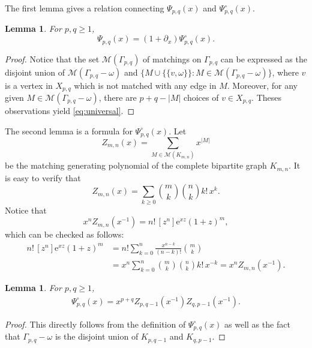 \documentclass[12pt,a4paper,reqno]{amsart}
\numberwithin{equation}{section}
\newtheorem{lemma}[theorem]{Lemma}
\theoremstyle{definition}
\theoremstyle{remark}
\newcommand{\Match}{\mathcal M}
\newcommand{\e}{\mathrm e}
\begin{document}
The first lemma gives  a relation connecting $ \Psi_{p,q}(x)$ and $\Psi^{\circ}_{p,q}(x)$. 

\begin{lemma}\label{lem:universal}
For   $p,q\geq1$,
\begin{equation}\label{eq:universal}
 \Psi_{p,q}(x)=(1+\partial_x)\Psi^{\circ}_{p,q}(x).
\end{equation}
\end{lemma}

\begin{proof}
Notice that the set  $\Match(\Gamma_{p,q})$ of matchings on $\Gamma_{p,q}$ can be expressed as the disjoint union of  $\Match(\Gamma_{p,q}-\omega)$ and $\{M\cup\{\{v,\omega\}\}\colon M\in\Match(\Gamma_{p,q}-\omega)\}$, where $v$ is a vertex in $X_{p,q}$ which is not matched with any edge in $M$. Moreover, for any given $M\in\Match(\Gamma_{p,q}-\omega)$, there are $p+q-|M|$ choices of $v\in X_{p,q}$. Theses observations yield  \eqref{eq:universal}.
\end{proof}

The second lemma is a formula for $\Psi^{\circ}_{p,q}(x)$.
Let  
\[
Z_{m,n}(x)=\sum_{M\in\Match(K_{m,n})}x^{|M|}
\]
be the matching generating polynomial of the complete bipartite graph $K_{m,n}$. It is easy to verify that 
\[
 Z_{m,n}(x)=\sum_{k\geq0}\binom{m}{k}\binom{n}{k}k!\,x^k.
\] 
Notice that   
\begin{equation}\label{eq:Z-coefficient-form} 
 x^nZ_{m,n}(x^{-1})
 =n!\,[z^n]\e^{xz}(1+z)^m,
\end{equation}
which can be checked as follows:
\begin{align*}
 n!\,[z^n]\e^{xz}(1+z)^m
 &=n!\sum_{k=0}^{n}\frac{x^{n-k}}{(n-k)!}\binom{m}{k}\\
 &=x^n\sum_{k=0}^{n}\binom{m}{k}\binom{n}{k}k!\,x^{-k}
 =x^nZ_{m,n}(x^{-1}).
\end{align*} 

\begin{lemma}\label{lem:complete-bipartite}
For   $p,q\geq1$,
\begin{align}
 \Psi^{\circ}_{p,q}(x)
 =x^{p+q}Z_{p,q-1}(x^{-1})Z_{q,p-1}(x^{-1}).
 \label{eq:Psi-circle-product} 
\end{align}
\end{lemma}

\begin{proof}
This directly  follows from the definition of $ \Psi^{\circ}_{p,q}(x)$  as well as the fact that $ \Gamma_{p,q}-\omega$ is the disjoint union of   $K_{p,q-1}$ and  $K_{q,p-1}$.
\end{proof}
\end{document}
